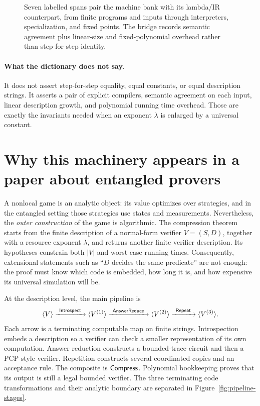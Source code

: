 \begin{figure}[t]
\centering

\caption{Seven labelled spans pair the machine bank with its lambda/IR counterpart, from finite programs and inputs through interpreters, specialization, and fixed points.  The bridge records semantic agreement plus linear-size and fixed-polynomial overhead rather than step-for-step identity.}
\label{fig:dictionary-bridge}
\end{figure}

\paragraph{What the dictionary does not say.}
It does not assert step-for-step equality, equal constants, or equal
description strings.  It asserts a pair of explicit compilers, semantic
agreement on each input, linear description growth, and polynomial running
time overhead.  Those are exactly the invariants needed when an exponent
\(\lambda\) is enlarged by a universal constant.

\section{Why this machinery appears in a paper about entangled provers}
\label{sec:refresher-why}

A nonlocal game is an analytic object: its value optimizes over strategies,
and in the entangled setting those strategies use states and measurements.
Nevertheless, the \emph{outer construction} of the game is algorithmic.  The
compression theorem starts from the finite description of a normal-form
verifier \(V=(S,D)\), together with a resource exponent \(\lambda\), and
returns another finite verifier description.  Its hypotheses constrain both
\(|V|\) and worst-case running times.  Consequently, extensional statements
such as ``\(D\) decides the same predicate'' are not enough: the proof must
know which code is embedded, how long it is, and how expensive its universal
simulation will be.

At the description level, the main pipeline is
\[
 \langle V\rangle
 \xrightarrow{\ \mathsf{Introspect}\ }
 \langle V^{(1)}\rangle
 \xrightarrow{\ \mathsf{AnswerReduce}\ }
 \langle V^{(2)}\rangle
 \xrightarrow{\ \mathsf{Repeat}\ }
 \langle V^{(3)}\rangle.
\]
Each arrow is a terminating computable map on finite strings.  Introspection
embeds a description so a verifier can check a smaller representation of its
own computation.  Answer reduction constructs a bounded-trace circuit and
then a PCP-style verifier.  Repetition constructs several coordinated copies
and an acceptance rule.  The composite is \(\mathsf{Compress}\).  Polynomial
bookkeeping proves that its output is still a legal bounded verifier.
The three terminating code transformations and their analytic boundary are
separated in Figure~\ref{fig:pipeline-stages}.

